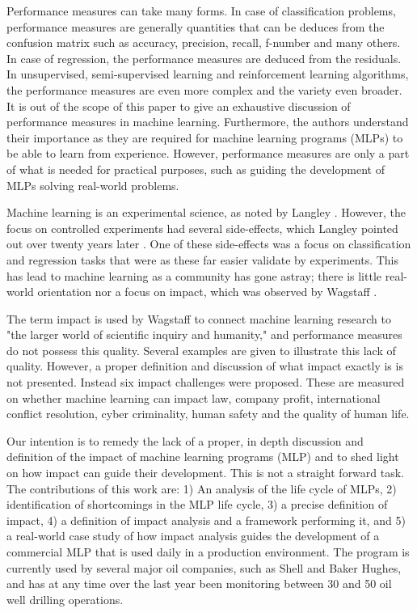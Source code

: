 \documentclass{article}
\theoremstyle{theorem}
\theoremstyle{definition}
\begin{document}
Performance measures can take many forms. 
In case of classification problems, performance measures are generally quantities that can be deduces from the confusion matrix such as accuracy, precision, recall, f-number and many others. 
In case of regression, the performance measures are deduced from the residuals. 
In unsupervised, semi-supervised learning and reinforcement learning algorithms, the performance measures are even more complex and the variety even broader. 
It is out of the scope of this paper to give an exhaustive discussion of performance measures in machine learning. 
Furthermore, the authors understand their importance as they are required for machine learning programs (MLPs) to be able to learn from experience. 
However, performance measures are only a part of what is needed for practical purposes, such as guiding the development of MLPs solving real-world problems.

Machine learning is an experimental science, as noted by Langley \cite{Langley_1988}.
However, the focus on controlled experiments had several side-effects, which Langley pointed out over twenty years later \cite{Langley_2011}.
One of these side-effects was a focus on classification and regression tasks that were as these far easier validate by experiments. 
This has lead to machine learning as a community has gone astray; there is little real-world orientation nor a focus on impact, which was observed by Wagstaff \cite{Wagstaff_2012}.

The term impact is used by Wagstaff to connect machine learning research to "the larger world of scientific inquiry and humanity," and performance measures do not possess this quality.
Several examples are given to illustrate this lack of quality.
However, a proper definition and discussion of what impact exactly is is not presented.
Instead six impact challenges were proposed.
These are measured on whether machine learning can impact law, company profit, international conflict resolution, cyber criminality, human safety and the quality of human life.

Our intention is to remedy the lack of a proper, in depth discussion and definition of the impact of machine learning programs (MLP) and to shed light on how impact can guide their development.
This is not a straight forward task.
The contributions of this work are: 1) An analysis of the life cycle of MLPs, 2) identification of shortcomings in the MLP life cycle, 3)  a precise definition of impact, 4) a definition of impact analysis and a framework performing it, and 5) a real-world case study of how impact analysis guides the development of a commercial MLP that is used daily in a production environment. 
The program is currently used by several major oil companies, such as Shell and Baker Hughes, and has at any time over the last year been monitoring between 30 and 50 oil well drilling operations.
\end{document}
